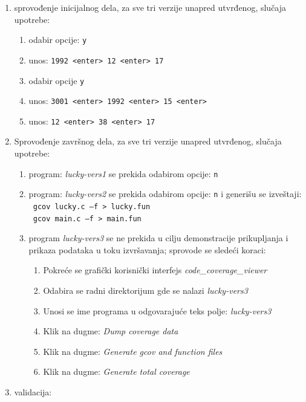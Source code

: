 \documentclass[12pt,oneside]{memoir}
\newcommand{\kod}[1]{\texttt{#1}}
\newcommand{\strano}[1]{\textit{#1}}
\begin{document}
\begin{enumerate}
\item sprovođenje inicijalnog dela, za sve tri verzije unapred utvrđenog, slučaja upotrebe:
\begin{enumerate}
\item odabir opcije: \kod{y}
\item unos: \kod{1992 <enter> 12 <enter> 17}
\item odabir opcije \kod{y}
\item unos: \kod{3001 <enter> 1992 <enter> 15 <enter>}
\item unos: \kod{12  <enter> 38 <enter> 17}
\end{enumerate}
\item Sprovođenje završnog dela, za sve tri verzije unapred utvrđenog, slučaja upotrebe:
\begin{enumerate}
\item program: \strano{lucky-vers1} se prekida odabirom opcije: \kod{n}
\item program: \strano{lucky-vers2} se prekida odabirom opcije: \kod{n} i generišu se izveštaji: \\
\kod{ gcov lucky.c –f  > lucky.fun} \\
\kod{ gcov main.c –f  > main.fun}
\item program \strano{lucky-vers3} se ne prekida u cilju demonstracije prikupljanja i prikaza podataka u toku izvršavanja; sprovode se sledeći koraci:
\begin{enumerate}
\item Pokreće se grafički korisnički interfejs \strano{code\_coverage\_viewer}
\item Odabira se radni direktorijum gde se nalazi \strano{lucky-vers3}
\item Unosi se ime programa u odgovarajuće teks polje: \strano{lucky-vers3}
\item Klik na dugme: \strano{Dump coverage data}
\item Klik na dugme: \strano{Generate gcov and function files}
\item Klik na dugme: \strano{Generate total coverage}
\end{enumerate}
\end{enumerate}
\item validacija: 
\begin{enumerate}


\end{enumerate}
\end{enumerate}
\end{document}
